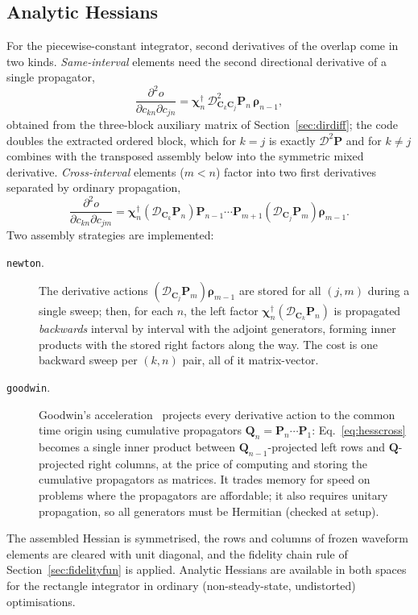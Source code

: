 \documentclass[11pt,a4paper]{article}
\newcommand{\code}[1]{\texttt{#1}}
\begin{document}
\subsection{Analytic Hessians}
\label{sec:hessians}

For the piecewise-constant integrator, second derivatives of the overlap
come in two kinds. \emph{Same-interval} elements need the second
directional derivative of a single propagator,
\begin{equation}
  \frac{\partial^2 o}{\partial c_{kn}\partial c_{jn}}
  =\boldsymbol{\chi}_{n}^{\dagger}\,
   \mathcal{D}^{2}_{\mathbf{C}_k\mathbf{C}_j}\mathbf{P}_n\,
   \boldsymbol{\rho}_{n-1},
\end{equation}
obtained from the three-block auxiliary matrix of
Section~\ref{sec:dirdiff}; the code doubles the extracted ordered block,
which for $k=j$ is exactly $\mathcal{D}^2\mathbf{P}$ and for $k\neq j$
combines with the transposed assembly below into the symmetric mixed
derivative. \emph{Cross-interval} elements ($m<n$) factor into two first
derivatives separated by ordinary propagation,
\begin{equation}
  \frac{\partial^2 o}{\partial c_{kn}\partial c_{jm}}
  =\boldsymbol{\chi}_{n}^{\dagger}
   \left(\mathcal{D}_{\mathbf{C}_k}\mathbf{P}_n\right)
   \mathbf{P}_{n-1}\cdots\mathbf{P}_{m+1}
   \left(\mathcal{D}_{\mathbf{C}_j}\mathbf{P}_m\right)
   \boldsymbol{\rho}_{m-1}.
  \label{eq:hesscross}
\end{equation}
Two assembly strategies are implemented:
\begin{description}
\item[\code{newton}.] The derivative actions
$(\mathcal{D}_{\mathbf{C}_j}\mathbf{P}_m)\boldsymbol{\rho}_{m-1}$ are
stored for all $(j,m)$ during a single sweep; then, for each $n$, the
left factor
$\boldsymbol{\chi}_{n}^{\dagger}(\mathcal{D}_{\mathbf{C}_k}\mathbf{P}_n)$
is propagated \emph{backwards} interval by interval with the adjoint
generators, forming inner products with the stored right factors along
the way. The cost is one backward sweep per $(k,n)$ pair, all of it
matrix-vector.
\item[\code{goodwin}.] Goodwin's acceleration~\cite{goodwin2016} projects
every derivative action to the common time origin using cumulative
propagators
$\mathbf{Q}_n=\mathbf{P}_n\cdots\mathbf{P}_1$:
Eq.~\eqref{eq:hesscross} becomes a single inner product between
$\mathbf{Q}_{n-1}$-projected left rows and $\mathbf{Q}$-projected right
columns, at the price of computing and storing the cumulative propagators
as matrices. It trades memory for speed on problems where the propagators
are affordable; it also requires unitary propagation, so all generators
must be Hermitian (checked at setup).
\end{description}
The assembled Hessian is symmetrised, the rows and columns of frozen
waveform elements are cleared with unit diagonal, and the fidelity chain
rule of Section~\ref{sec:fidelityfun} is applied. Analytic Hessians are
available in both spaces for the rectangle integrator in ordinary
(non-steady-state, undistorted) optimisations.
\end{document}

